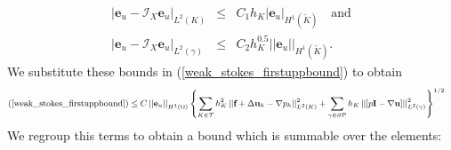\documentclass{article}
\begin{document}
\begin{eqnarray}
\left|\textbf{e}_u-\mathcal{I}_X\textbf{e}_u\right|_{L^2\left(K\right)} &\leq & C_1h_K\left|\textbf{e}_u\right|_{H^1\left(\widetilde{K}\right)}\quad\text{and}\\
\left|\textbf{e}_u-\mathcal{I}_X\textbf{e}_u\right|_{L^2\left(\gamma\right)} &\leq &C_2h_K^{0.5}\left|\left|\textbf{e}_u\right|\right|_{H^1\left(\widetilde{K}\right)}.
\end{eqnarray}
We substitute these bounds in (\ref{weak_stokes_firstuppbound}) to obtain
\begin{equation}\small
\begin{aligned}
\text{(\ref{weak_stokes_firstuppbound})}&\leq C\left|\left|\textbf{e}_u\right|\right|_{H^1\left(\Omega\right)}\left\{\sum_{K\in\mathcal{T}}h_K^2\left|\left|\textbf{f}+\Delta \textbf{u}_h-\nabla p_h\right|\right|^2_{L^2\left(K\right)} +\sum_{\gamma\in \partial \mathcal{P}}h_K\left|\left|\left[p\textbf{I}-\nabla\textbf{u}\right]\right|\right|_{L^2\left(\gamma\right)}^2\right\}^{1/2}
\end{aligned}
\end{equation}
We regroup this terms to obtain a bound which is summable over the elements:
\end{document}

